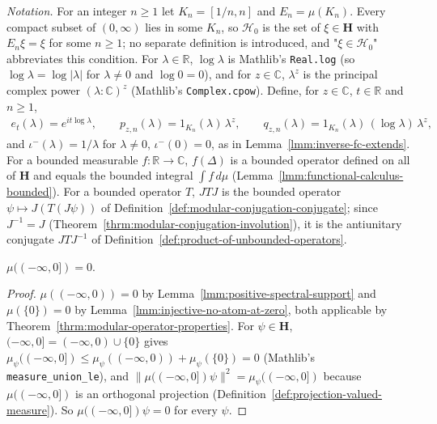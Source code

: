 \emph{Notation.} For an integer $n \ge 1$ let $K_n = [1/n, n]$ and $E_n = \mu(K_n)$. Every compact subset of $(0, \infty)$ lies in some $K_n$, so $\mathcal{H}_0$ is the set of $\xi \in \mathbf{H}$ with $E_n\xi = \xi$ for some $n \ge 1$; no separate definition is introduced, and "$\xi \in \mathcal{H}_0$" abbreviates this condition. For $\lambda \in \mathbb{R}$, $\log \lambda$ is Mathlib's \texttt{Real.log} (so $\log \lambda = \log|\lambda|$ for $\lambda \ne 0$ and $\log 0 = 0$), and for $z \in \mathbb{C}$, $\lambda^z$ is the principal complex power $(\lambda : \mathbb{C})^z$ (Mathlib's \texttt{Complex.cpow}). Define, for $z \in \mathbb{C}$, $t \in \mathbb{R}$ and $n \ge 1$,
\begin{align}
    e_t(\lambda) = e^{it\log\lambda}, \qquad p_{z,n}(\lambda) = 1_{K_n}(\lambda)\,\lambda^z, \qquad q_{z,n}(\lambda) = 1_{K_n}(\lambda)\,(\log\lambda)\,\lambda^z,
\end{align}
and $\iota^-(\lambda) = 1/\lambda$ for $\lambda \ne 0$, $\iota^-(0) = 0$, as in Lemma~\ref{lmm:inverse-fc-extends}. For a bounded measurable $f : \mathbb{R} \to \mathbb{C}$, $f(\Delta)$ is a bounded operator defined on all of $\mathbf{H}$ and equals the bounded integral $\int f \, d\mu$ (Lemma~\ref{lmm:functional-calculus-bounded}). For a bounded operator $T$, $JTJ$ is the bounded operator $\psi \mapsto J(T(J\psi))$ of Definition~\ref{def:modular-conjugation-conjugate}; since $J^{-1} = J$ (Theorem~\ref{thrm:modular-conjugation-involution}), it is the antiunitary conjugate $JTJ^{-1}$ of Definition~\ref{def:product-of-unbounded-operators}.

\begin{lemma}[$\Delta$ has no Spectrum in {$(-\infty, 0]$}]
    \label{lmm:modular-spectral-support}
    \leanok
    $\mu((-\infty, 0]) = 0$.
\end{lemma}
\begin{proof}
    \leanok
    $\mu((-\infty, 0)) = 0$ by Lemma~\ref{lmm:positive-spectral-support} and $\mu(\{0\}) = 0$ by Lemma~\ref{lmm:injective-no-atom-at-zero}, both applicable by Theorem~\ref{thrm:modular-operator-properties}. For $\psi \in \mathbf{H}$, $(-\infty, 0] = (-\infty, 0) \cup \{0\}$ gives $\mu_\psi((-\infty, 0]) \le \mu_\psi((-\infty, 0)) + \mu_\psi(\{0\}) = 0$ (Mathlib's \texttt{measure\_union\_le}), and $\|\mu((-\infty, 0])\psi\|^2 = \mu_\psi((-\infty, 0])$ because $\mu((-\infty, 0])$ is an orthogonal projection (Definition~\ref{def:projection-valued-measure}). So $\mu((-\infty, 0])\psi = 0$ for every $\psi$.
\end{proof}

